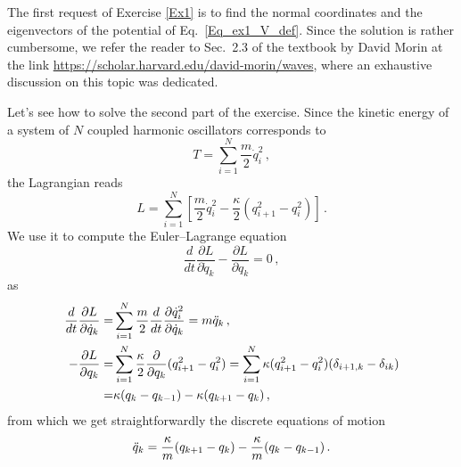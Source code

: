\begin{sol}
    The first request of Exercise \ref{Ex1} is to find the normal coordinates and the eigenvectors of the potential of Eq.~\eqref{Eq_ex1_V_def}. Since the solution is rather cumbersome, we refer the reader to Sec.~2.3 of the textbook by David Morin at the link \url{https://scholar.harvard.edu/david-morin/waves}, where an exhaustive discussion on this topic was dedicated.

    Let's see how to solve the second part of the exercise. Since the kinetic energy of a system of $N$ coupled harmonic oscillators corresponds to 
    \begin{equation}
        T =\sum_{i=1}^{N} \frac{m}{2} \dot{q}_i^2 \, ,
    \end{equation}
    the Lagrangian reads
    \begin{equation}
        L = \sum_{i=1}^{N} \left[\frac{m}{2} \dot{q}_i^2 - \frac{\kappa}{2} (q_{i+1}^2 - q_i^2)\right] \, . 
    \end{equation}
    We use it to compute the Euler–Lagrange equation
    \begin{equation}
        \frac{d}{dt} \frac{\partial L}{\partial \dot{q}_k} - \frac{\partial L}{\partial q_k} = 0 \,,
    \end{equation}
    as
    \begin{equation}
    \begin{split}
        \frac{d}{dt} \frac{\partial L}{\partial \dot{q}_k} 
        = & \sum_{i=1}^{N} \frac{m}{2} \frac{d}{dt} \frac{\partial \dot{q}_i^2}{\partial \dot{q}_k} = m \Ddot{q}_k \, , \\
        - \frac{\partial L}{\partial q_k} = & \sum_{i=1}^{N} \frac{\kappa}{2} \frac{\partial}{\partial q_k} (q_{i+1}^2 - q_i^2) = \sum_{i=1}^{N} \kappa (q_{i+1}^2 - q_i^2) (\delta_{i+1,k} - \delta_{ik}) \\
        = &  \kappa (q_k - q_{k-1}) - \kappa(q_{k+1} - q_k) \, , 
    \end{split}
    \end{equation}
    from which we get straightforwardly the discrete equations of motion
    \begin{equation}
        \Ddot{q}_k = \frac{\kappa}{m} (q_{k+1} - q_k) - \frac{\kappa}{m} (q_k - q_{k-1}) \, .
        \label{Eq:question_one_discrete_eom}
    \end{equation}
    

\end{sol}
